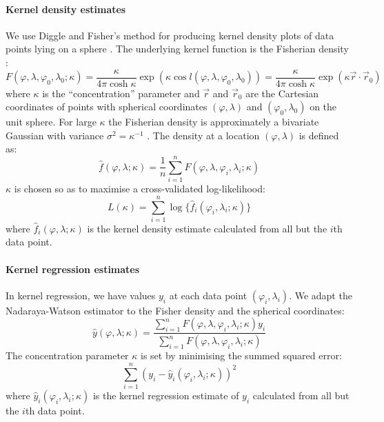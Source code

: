 \documentclass[10pt]{article}
\begin{document}
\paragraph{Kernel density estimates}
We use Diggle and Fisher's method for producing kernel density plots
of data points lying on a sphere \cite{DiggleFisher1985}. The
underlying kernel function is the Fisherian density \cite{Fisher1953}:
\begin{equation}
F(\varphi ,\lambda ,\varphi _0,\lambda _0;\kappa )=\frac{\kappa }{4\pi
\cosh \kappa }\exp (\kappa \cos l(\varphi ,\lambda
,\varphi _0,\lambda _0))=\frac{\kappa }{4\pi \cosh \kappa
}\exp (\kappa \vec r\cdot \vec r_0)
\end{equation}
where  $\kappa $ is the ``concentration'' parameter and   $\vec r$ and
 $\vec r_0$ are the Cartesian coordinates of points with spherical
coordinates  $(\varphi ,\lambda )$ and  $(\varphi _0,\lambda _0)$ on
the unit sphere. For large  $\kappa $ the Fisherian density is
approximately a bivariate Gaussian with variance  $\sigma ^2=\kappa
^{-1}$ \cite{DiggleFisher1985}. The density at a location  $(\varphi
,\lambda )$ is defined as:
\begin{equation}
\hat f(\varphi ,\lambda ;\kappa )=\frac 1 n\sum _{i=1}^nF(\varphi
,\lambda ,\varphi _i,\lambda _i;\kappa )
\end{equation}
 $\kappa $  is chosen so as to maximise a cross-validated
log-likelihood:
\begin{equation}
L(\kappa )=\sum _{i=1}^n\log \{\hat f_i(\varphi _i,\lambda
_i;\kappa )\}
\end{equation}
where  $\hat f_i(\varphi ,\lambda ;\kappa )$ is the kernel density
estimate calculated from all but the  $i$th data point. 

\paragraph{Kernel regression estimates}
In kernel regression, we have values  $y_i$ at each data point 
$(\varphi _i,\lambda _i)$. We adapt the Nadaraya-Watson estimator \cite{Nadaraya1964,Watson1964} to the Fisher density and the spherical
coordinates:
\begin{equation}
\hat y(\varphi ,\lambda ;\kappa )=\frac{\sum _{i=1}^nF(\varphi
,\lambda ,\varphi _i,\lambda _i;\kappa )y_i}{\sum _{i=1}^nF(\varphi
,\lambda ,\varphi _i,\lambda _i;\kappa )}
\end{equation}
The concentration parameter  $\kappa $ is set by minimising the summed
squared error:
\begin{equation}
\sum _{i=1}^n(y_i-\hat y_i(\varphi _i,\lambda _i;\kappa ))^2
\end{equation}
 where  $\hat y_i(\varphi _i,\lambda _i;\kappa )$ is the kernel
regression estimate of  $y_i$ calculated from all but the  $i$th
data point. 
\end{document}
